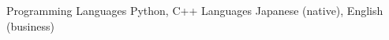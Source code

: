 
\begin{cvskills}
  \cvskill
    {Programming Languages} %
    {Python, C++} %
  \cvskill
    {Languages} %
    {Japanese (native), English (business)} %
\end{cvskills}
